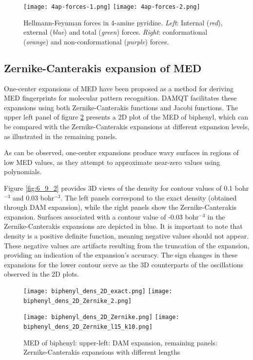 \documentclass[10pt]{article}
\begin{document}
\begin{figure}[H]
\begin{center}
\texttt{[image: 4ap-forces-1.png]}
\hspace*{5mm}
\texttt{[image: 4ap-forces-2.png]}
\end{center}
\caption[Hellmann-Feynman forces in 4-amine pyridine]{ Hellmann-Feynman forces in 4-amine pyridine. 
{\it Left}: Internal ({\it red}), external ({\it blue}) and total ({\it green}) forces. 
{\it Right}: conformational ({\it orange}) and non-conformational ({\it purple}) forces.
\label{fig:6_8_1}}
\end{figure}

\subsection{Zernike-Canterakis expansion of MED \label{sec:6.9} }

One-center expansions of MED have been proposed as a method for deriving MED fingerprints 
for molecular pattern recognition. DAMQT facilitates these expansions using both 
Zernike-Canterakis functions and Jacobi functions. The upper left panel of figure 
\ref{fig:6_9_1} presents a 2D plot of the MED of biphenyl, which can be compared with 
the Zernike-Canterakis expansions at different expansion levels, as illustrated in the 
remaining panels. 

As can be observed, one-center expansions produce wavy surfaces in regions of 
low MED values, as they attempt to approximate near-zero values using polynomials. 

Figure \ref{fig:6_9_2} provides 3D views of the density for contour values of 
0.1 bohr$^{-3}$ and 0.03 bohr$^{-3}$. The left panels correspond to the exact 
density (obtained through DAM expansion), while the right panels show the 
Zernike-Canterakis expansion. Surfaces associated with a contour value of 
-0.03 bohr$^{-3}$ in the Zernike-Canterakis expansions are depicted in blue. 
It is important to note that density is a positive definite function, meaning 
negative values should not appear. These negative values are artifacts resulting 
from the truncation of the expansion, providing an indication of the expansion’s accuracy. 
The sign changes in these expansions for the lower contour serve as the 3D counterparts 
of the oscillations observed in the 2D plots.


\begin{figure}[H]
\begin{center}
\texttt{[image: biphenyl\_dens\_2D\_exact.png]}
\hspace*{5mm}
\texttt{[image: biphenyl\_dens\_2D\_Zernike\_2.png]}

\texttt{[image: biphenyl\_dens\_2D\_Zernike.png]}
\hspace*{5mm}
\texttt{[image: biphenyl\_dens\_2D\_Zernike\_l15\_k10.png]}
\end{center}
\caption[2D MED Zernike-Canterakis expansions of biphenyl]{ MED of biphenyl: upper-left: DAM expansion, remaining panels: Zernike-Canterakis expansions with different
lengths
\label{fig:6_9_1}}
\end{figure}
\end{document}
